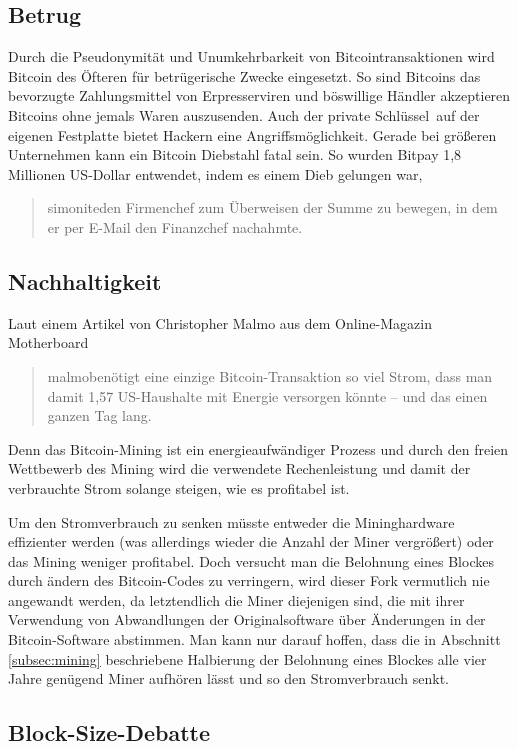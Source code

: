 \subsection{Betrug}

Durch die Pseudonymität und Unumkehrbarkeit von Bitcointransaktionen wird Bitcoin des Öfteren für betrügerische Zwecke eingesetzt.
So sind Bitcoins das bevorzugte Zahlungsmittel von Erpresserviren und böswillige Händler akzeptieren Bitcoins ohne jemals Waren auszusenden.
Auch der private Schlüssel auf der eigenen Festplatte bietet Hackern eine Angriffsmöglichkeit.
Gerade bei größeren Unternehmen kann ein Bitcoin Diebstahl fatal sein.
So wurden Bitpay 1,8 Millionen US-Dollar entwendet, indem es einem Dieb gelungen war, \begin{quote}{simonite}den Firmenchef zum Überweisen der Summe zu bewegen, in dem er per E-Mail den Finanzchef nachahmte.\end{quote}

\subsection{Nachhaltigkeit}

Laut einem Artikel von Christopher Malmo aus dem Online-Magazin Motherboard \begin{quote}{malmo}benötigt eine einzige Bitcoin-Transaktion so viel Strom, dass man damit 1,57 US-Haushalte mit Energie versorgen könnte -- und das einen ganzen Tag lang.\end{quote}
Denn das Bitcoin-Mining ist ein energieaufwändiger Prozess und durch den freien Wettbewerb des Mining wird die verwendete Rechenleistung und damit der verbrauchte Strom solange steigen, wie es profitabel ist.

Um den Stromverbrauch zu senken müsste entweder die Mininghardware effizienter werden (was allerdings wieder die Anzahl der Miner vergrößert) oder das Mining weniger profitabel.
Doch versucht man die Belohnung eines Blockes durch ändern des Bitcoin-Codes zu verringern, wird dieser Fork vermutlich nie angewandt werden, da letztendlich die Miner diejenigen sind, die mit ihrer Verwendung von Abwandlungen der Originalsoftware über Änderungen in der Bitcoin-Software abstimmen.
Man kann nur darauf hoffen, dass die in Abschnitt \ref{subsec:mining} beschriebene Halbierung der Belohnung eines Blockes alle vier Jahre genügend Miner aufhören lässt und so den Stromverbrauch senkt.

\subsection{Block-Size-Debatte}
\label{sec:blocksize}

